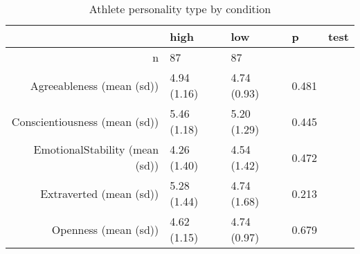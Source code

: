 \begin{table}[ht]
\centering
\begin{tabular}{rllll}
  \hline
 & high & low & p & test \\ 
  \hline
n &   87 &   87 &  &  \\ 
  Agreeableness (mean (sd)) & 4.94 (1.16) & 4.74 (0.93) &  0.481 &  \\ 
  Conscientiousness (mean (sd)) & 5.46 (1.18) & 5.20 (1.29) &  0.445 &  \\ 
  EmotionalStability (mean (sd)) & 4.26 (1.40) & 4.54 (1.42) &  0.472 &  \\ 
  Extraverted (mean (sd)) & 5.28 (1.44) & 4.74 (1.68) &  0.213 &  \\ 
  Openness (mean (sd)) & 4.62 (1.15) & 4.74 (0.97) &  0.679 &  \\ 
   \hline
\end{tabular}
\caption{Athlete personality type by condition} 
\end{table}
